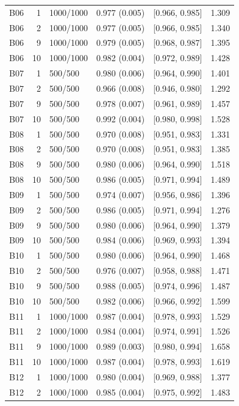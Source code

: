 \begin{longtable}[t]{lrllll}
B06 & 1 & 1000/1000 & 0.977 (0.005) & {}[0.966, 0.985] & 1.309\\
B06 & 2 & 1000/1000 & 0.977 (0.005) & {}[0.966, 0.985] & 1.340\\
B06 & 9 & 1000/1000 & 0.979 (0.005) & {}[0.968, 0.987] & 1.395\\
B06 & 10 & 1000/1000 & 0.982 (0.004) & {}[0.972, 0.989] & 1.428\\
B07 & 1 & 500/500 & 0.980 (0.006) & {}[0.964, 0.990] & 1.401\\
B07 & 2 & 500/500 & 0.966 (0.008) & {}[0.946, 0.980] & 1.292\\
B07 & 9 & 500/500 & 0.978 (0.007) & {}[0.961, 0.989] & 1.457\\
B07 & 10 & 500/500 & 0.992 (0.004) & {}[0.980, 0.998] & 1.528\\
B08 & 1 & 500/500 & 0.970 (0.008) & {}[0.951, 0.983] & 1.331\\
B08 & 2 & 500/500 & 0.970 (0.008) & {}[0.951, 0.983] & 1.385\\
B08 & 9 & 500/500 & 0.980 (0.006) & {}[0.964, 0.990] & 1.518\\
B08 & 10 & 500/500 & 0.986 (0.005) & {}[0.971, 0.994] & 1.489\\
B09 & 1 & 500/500 & 0.974 (0.007) & {}[0.956, 0.986] & 1.396\\
B09 & 2 & 500/500 & 0.986 (0.005) & {}[0.971, 0.994] & 1.276\\
B09 & 9 & 500/500 & 0.980 (0.006) & {}[0.964, 0.990] & 1.379\\
B09 & 10 & 500/500 & 0.984 (0.006) & {}[0.969, 0.993] & 1.394\\
B10 & 1 & 500/500 & 0.980 (0.006) & {}[0.964, 0.990] & 1.468\\
B10 & 2 & 500/500 & 0.976 (0.007) & {}[0.958, 0.988] & 1.471\\
B10 & 9 & 500/500 & 0.988 (0.005) & {}[0.974, 0.996] & 1.487\\
B10 & 10 & 500/500 & 0.982 (0.006) & {}[0.966, 0.992] & 1.599\\
B11 & 1 & 1000/1000 & 0.987 (0.004) & {}[0.978, 0.993] & 1.529\\
B11 & 2 & 1000/1000 & 0.984 (0.004) & {}[0.974, 0.991] & 1.526\\
B11 & 9 & 1000/1000 & 0.989 (0.003) & {}[0.980, 0.994] & 1.658\\
B11 & 10 & 1000/1000 & 0.987 (0.004) & {}[0.978, 0.993] & 1.619\\
B12 & 1 & 1000/1000 & 0.980 (0.004) & {}[0.969, 0.988] & 1.377\\
B12 & 2 & 1000/1000 & 0.985 (0.004) & {}[0.975, 0.992] & 1.483\\

\end{longtable}
